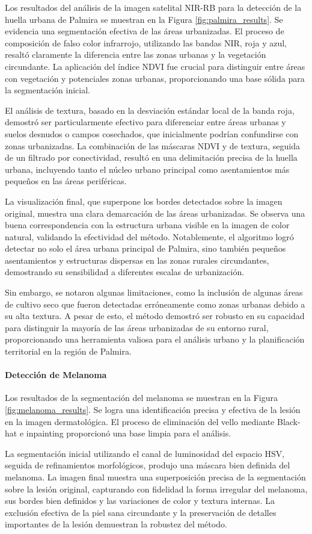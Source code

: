 Los resultados del análisis de la imagen satelital NIR-RB para la detección de la huella urbana de Palmira se muestran en la Figura  \ref{fig:palmira_results}. Se evidencia una segmentación efectiva de las áreas urbanizadas. El proceso de composición de falso color infrarrojo, utilizando las bandas NIR, roja y azul, resaltó claramente la diferencia entre las zonas urbanas y la vegetación circundante. La aplicación del índice NDVI fue crucial para distinguir entre áreas con vegetación y potenciales zonas urbanas, proporcionando una base sólida para la segmentación inicial.

El análisis de textura, basado en la desviación estándar local de la banda roja, demostró ser particularmente efectivo para diferenciar entre áreas urbanas y suelos desnudos o campos cosechados, que inicialmente podrían confundirse con zonas urbanizadas. La combinación de las máscaras NDVI y de textura, seguida de un filtrado por conectividad, resultó en una delimitación precisa de la huella urbana, incluyendo tanto el núcleo urbano principal como asentamientos más pequeños en las áreas periféricas.

La visualización final, que superpone los bordes detectados sobre la imagen original, muestra una clara demarcación de las áreas urbanizadas. Se observa una buena correspondencia con la estructura urbana visible en la imagen de color natural, validando la efectividad del método. Notablemente, el algoritmo logró detectar no solo el área urbana principal de Palmira, sino también pequeños asentamientos y estructuras dispersas en las zonas rurales circundantes, demostrando su sensibilidad a diferentes escalas de urbanización.

Sin embargo, se notaron algunas limitaciones, como la inclusión de algunas áreas de cultivo seco que fueron detectadas erróneamente como zonas urbanas debido a su alta textura. A pesar de esto, el método demostró ser robusto en su capacidad para distinguir la mayoría de las áreas urbanizadas de su entorno rural, proporcionando una herramienta valiosa para el análisis urbano y la planificación territorial en la región de Palmira.



\paragraph{Detección de Melanoma}

Los resultados de la segmentación del melanoma se muestran en la Figura \ref{fig:melanoma_results}. Se logra una identificación precisa y efectiva de la lesión en la imagen dermatológica. El proceso de eliminación del vello mediante Black-hat e inpainting proporcionó una base limpia para el análisis. 

La segmentación inicial utilizando el canal de luminosidad del espacio HSV, seguida de refinamientos morfológicos, produjo una máscara bien definida del melanoma. La imagen final muestra una superposición precisa de la segmentación sobre la lesión original, capturando con fidelidad la forma irregular del melanoma, sus bordes bien definidos y las variaciones de color y textura internas. La exclusión efectiva de la piel sana circundante y la preservación de detalles importantes de la lesión demuestran la robustez del método.